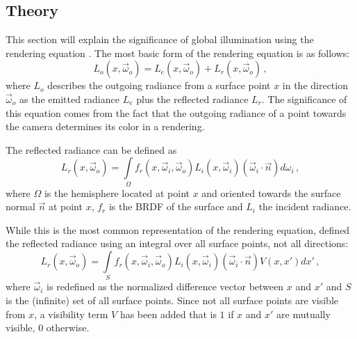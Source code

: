 \subsection{Theory}
\label{sec:intro:gi:theory}


\newcommand{\dir}{\vec\omega} %

\newcommand{\outgoingDir}{ \dir_o}
\newcommand{\incidenceDir}{\dir_i}

\newcommand{\outgoingRadiance}{  L_o(x, \outgoingDir)}
\newcommand{\emittedRadiance}{   L_e(x, \outgoingDir)}
\newcommand{\reflectedRadiance}{ L_r(x, \outgoingDir)}
\newcommand{\incidentRadiance}{  L_i(x, \incidenceDir)}

\newcommand{\brdf}{f_r} %

\newcommand{\surfaceNormal}{\vec{n}}

This section will explain the significance of global illumination using the rendering equation \citep{Kajiya:1986:RenderingEquation}. The most basic form of the rendering equation is as follows:
%
\begin{equation}
\outgoingRadiance = \emittedRadiance + \reflectedRadiance\,,
\label{eq:renderBasic}
\end{equation}
%
where $L_o$ describes the outgoing radiance from a surface point $x$ in the direction $\outgoingDir$ as the emitted radiance $L_e$ plus the reflected radiance $L_r$. The significance of this equation comes from the fact that the outgoing radiance of a point towards the camera determines its color in a rendering.

The reflected radiance can be defined as
%
\begin{equation}
\reflectedRadiance = \int\limits_{\Omega} \brdf(x, \incidenceDir, \outgoingDir)\incidentRadiance (\incidenceDir \cdot \surfaceNormal) d \omega_i\,,
\label{eq:render}
\end{equation}
%
where $\Omega$ is the hemisphere located at point $x$ and oriented towards the surface normal $\surfaceNormal$ at point $x$, $\brdf$ is the BRDF of the surface and $L_i$ the incident radiance.

While this is the most common representation of the rendering equation, \citet{Kajiya:1986:RenderingEquation} defined the reflected radiance using an integral over all surface points, not all directions:
%
  \begin{equation}
    \reflectedRadiance = \int\limits_{S} \brdf(x, \incidenceDir, \outgoingDir) \incidentRadiance (\incidenceDir \cdot \surfaceNormal) V(x, x') d x'\,,
  \label{eq:renderWithVisibility}
  \end{equation}
%
where $\incidenceDir$ is redefined as the normalized difference vector between $x$ and $x'$ and $S$ is the (infinite) set of all surface points. Since not all surface points are visible from $x$, a visibility term $V$ has been added that is $1$ if $x$ and $x'$ are mutually visible, $0$ otherwise.

